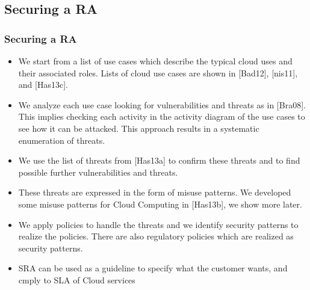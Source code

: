 \documentclass[serif,9pt]{beamer}
\begin{document}
\subsection{Securing a RA}
\begin{frame}
	\frametitle{Securing a RA}
	\begin{itemize}
		\item<1-> We start from a list of use cases which describe the typical cloud uses and their associated roles. Lists of cloud use cases are shown in [Bad12], [nis11], and [Has13c]. 
		\item<2-> We analyze each use case looking for vulnerabilities and threats as in [Bra08]. This implies checking each activity in the activity diagram of the use cases to see how it can be attacked. This approach results in a systematic enumeration of threats.
		\item<3-> We use the list of threats from [Has13a] to confirm these threats and to find possible further vulnerabilities and threats.
		\item<4-> These threats are expressed in the form of misuse patterns. We developed some misuse patterns for Cloud Computing in [Has13b], we show more later.
		\item<5-> We apply policies to handle the threats and we identify security patterns to realize the policies.  There are also regulatory policies which are realized as security patterns.
		\item<6-> SRA can be used as a guideline to specify what the customer wants, and cmply to SLA of Cloud services

	\end{itemize}
\end{frame}
\end{document}
